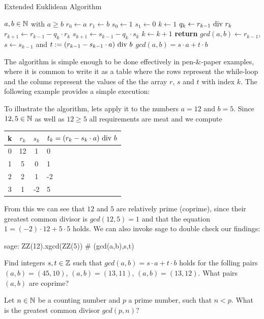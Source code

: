 \begin{algorithm}\caption{Extended Euklidean Algorithm}
\label{alg_ext_euclid_alg}
\begin{algorithmic}[0]
\Require $a,b \in \mathbb{N}$ with $a\geq b$
\State $r_0\gets a$
\State $r_1\gets b$
\State $s_0\gets 1$
\State $s_1\gets 0$
\State $k\gets 1$
\State $ q_k\gets r_{k-1} \text{ div } r_k $
\State $ r_{k + 1}\gets r_{k-1} -q_k \cdot r_k $
\State $ s_{k + 1}\gets s_{k-1} -q_k \cdot s_k $
\State $ k \gets k + 1 $
\EndWhile
\State \textbf{return} $gcd(a,b)\gets r_{k-1}$, $s\gets s_{k-1}$ and $ t: = (r_{k-1}-s_{k-1} \cdot a) \text{ div } b $ 
\EndProcedure
\Ensure $ gcd (a, b) = s \cdot a + t \cdot b $
\end{algorithmic}
\end{algorithm}
The algorithm is simple enough to be done effectively in pen-\&-paper examples, where it is common to write it as a table where the rows represent the while-loop and the colums represent the values of the the array $r$, $s$ and $t$ with index $k$. The following example provides a simple execution:
\begin{example} To illustrate the algorithm, lets apply it to the numbers $a=12$ and $b=5$. Since $12,5\in \mathbb{N}$ as well as $12\geq 5$ all requirements are meat and we compute
\begin{center}
  \begin{tabular}{c | c c l}
    k & $ r_k $ & $ s_k $ & $ t_k = (r_k-s_k \cdot a) \text{ div } b $ \\\hline
    0 & 12 & 1 & 0 \\
    1 & 5 & 0 & 1 \\
    2 & 2 & 1 & -2 \\
    3 & 1 & -2 & 5 \\
  \end{tabular}
\end{center}
From this we can see that $ 12 $ and $ 5 $ are relatively prime (coprime), since their greatest common divisor is $ gcd (12, 5) = 1 $ and that the equation $ 1 = (-2) \cdot 12 + 5 \cdot 5 $ holds. We can also invoke sage to double check our findings:
\begin{sagecommandline}
sage: ZZ(12).xgcd(ZZ(5)) # (gcd(a,b),s,t)
\end{sagecommandline}
\end{example}
\begin{exercise}
Find integers $s,t\in\mathbb{Z}$ such that $gcd(a,b)= s\cdot a +t\cdot b$ holds for the folling pairs $(a,b) = (45,10)$, $(a,b)=(13,11)$, $(a,b)=(13,12)$. What pairs $(a,b)$ are coprime?
\end{exercise}
\begin{exercise}
Let $n\in \mathbb{N}$ be a counting number and $p$ a prime number, such that $n<p$. What is the greatest common divisor $gcd(p,n)$?
\end{exercise}

